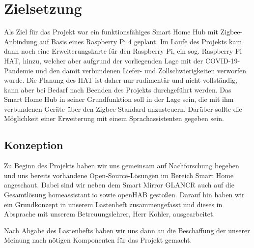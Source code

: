 \documentclass[12pt,a4paper]{article}
\begin{document}
 	\newpage
	\section{Zielsetzung}
	Als Ziel für das Projekt war ein funktionsfähiges Smart Home Hub mit Zigbee-Anbindung auf Basis eines Raspberry Pi 4 geplant. Im Laufe des Projekts kam dann noch eine Erweiterungskarte für den Raspberry Pi, ein sog. Raspberry Pi HAT, hinzu, welcher aber aufgrund der vorliegenden Lage mit der COVID-19-Pandemie und den damit verbundenen Liefer- und Zollschwierigkeiten verworfen wurde. Die Planung des HAT ist daher nur rudimentär und nicht vollständig, kann aber bei Bedarf nach Beenden des Projekts durchgeführt werden. Das Smart Home Hub in seiner Grundfunktion soll in der Lage sein, die mit ihm verbundenen Geräte über den Zigbee-Standard anzusteuern. Darüber sollte die Möglichkeit einer Erweiterung mit einem Sprachassistenten gegeben sein.\par
	\subsection{Konzeption}
	Zu Beginn des Projekts haben wir uns gemeinsam auf Nachforschung begeben und uns bereits vorhandene Open-Source-Lösungen im Bereich Smart Home angeschaut. Dabei sind wir neben dem Smart Mirror GLANCR auch auf die Gesamtlösung homeassistant.io sowie openHAB gestoßen. Darauf hin haben wir ein Grundkonzept in unserem Lastenheft zusammengefasst und dieses in Absprache mit unserem Betreuungslehrer, Herr Kohler, ausgearbeitet.\par
	Nach Abgabe des Lastenhefts haben wir uns dann an die Beschaffung der unserer Meinung nach nötigen Komponenten für das Projekt gemacht.
\end{document}
